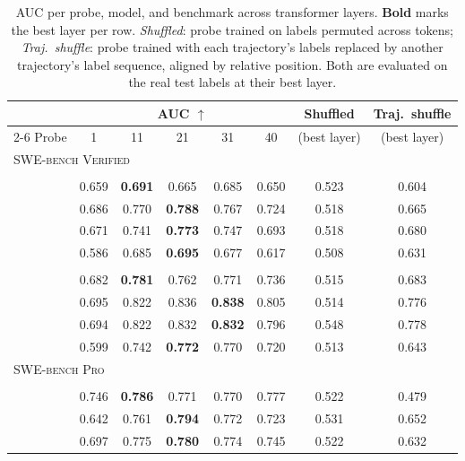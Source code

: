 \begin{table}[t]
\centering
\caption{AUC per probe, model, and benchmark across transformer layers. \textbf{Bold} marks the best layer per row. \emph{Shuffled}: probe trained on labels permuted across tokens; \emph{Traj.\ shuffle}: probe trained with each trajectory's labels replaced by another trajectory's label sequence, aligned by relative position. Both are evaluated on the real test labels at their best layer.}
\label{tab:auc_roc}
\begin{tabular}{lccccccc}
\toprule
 & \multicolumn{5}{c}{AUC $\uparrow$} & Shuffled & Traj.\ shuffle \\
\cmidrule(lr){2-6}
Probe & 1 & 11 & 21 & 31 & 40 & (best layer) & (best layer) \\
\midrule
\multicolumn{8}{l}{\textsc{SWE-bench Verified}} \\
\addlinespace[2pt]
\multicolumn{8}{l}{\quad\textit{Laguna-XS.2}} \\
\Syntactic{} & 0.659 & \textbf{0.691} & 0.665 & 0.685 & 0.650 & 0.523 & 0.604 \\
\Semantic{} & 0.686 & 0.770 & \textbf{0.788} & 0.767 & 0.724 & 0.518 & 0.665 \\
\RedFail{} & 0.671 & 0.741 & \textbf{0.773} & 0.747 & 0.693 & 0.518 & 0.680 \\
\Regressions{} & 0.586 & 0.685 & \textbf{0.695} & 0.677 & 0.617 & 0.508 & 0.631 \\
\addlinespace[3pt]
\multicolumn{8}{l}{\quad\textit{Qwen3.6-35B-A3B}} \\
\Syntactic{} & 0.682 & \textbf{0.781} & 0.762 & 0.771 & 0.736 & 0.515 & 0.683 \\
\Semantic{} & 0.695 & 0.822 & 0.836 & \textbf{0.838} & 0.805 & 0.514 & 0.776 \\
\RedFail{} & 0.694 & 0.822 & 0.832 & \textbf{0.832} & 0.796 & 0.548 & 0.778 \\
\Regressions{} & 0.599 & 0.742 & \textbf{0.772} & 0.770 & 0.720 & 0.513 & 0.643 \\
\midrule
\multicolumn{8}{l}{\textsc{SWE-bench Pro}} \\
\addlinespace[2pt]
\multicolumn{8}{l}{\quad\textit{Laguna-XS.2}} \\
\Syntactic{} & 0.746 & \textbf{0.786} & 0.771 & 0.770 & 0.777 & 0.522 & 0.479 \\
\Semantic{} & 0.642 & 0.761 & \textbf{0.794} & 0.772 & 0.723 & 0.531 & 0.652 \\
\RedFail{} & 0.697 & 0.775 & \textbf{0.780} & 0.774 & 0.745 & 0.522 & 0.632 \\

\end{tabular}
\end{table}
